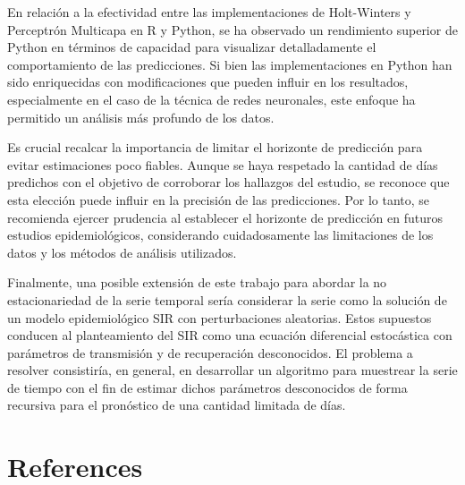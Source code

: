 \documentclass[
  us-letterpaper,
]{scrreprt}
\theoremstyle{definition}
\theoremstyle{plain}
\theoremstyle{plain}
\theoremstyle{definition}
\theoremstyle{remark}
\begin{document}
En relación a la efectividad entre las implementaciones de Holt-Winters
y Perceptrón Multicapa en R y Python, se ha observado un rendimiento
superior de Python en términos de capacidad para visualizar
detalladamente el comportamiento de las predicciones. Si bien las
implementaciones en Python han sido enriquecidas con modificaciones que
pueden influir en los resultados, especialmente en el caso de la técnica
de redes neuronales, este enfoque ha permitido un análisis más profundo
de los datos.

Es crucial recalcar la importancia de limitar el horizonte de predicción
para evitar estimaciones poco fiables. Aunque se haya respetado la
cantidad de días predichos con el objetivo de corroborar los hallazgos
del estudio, se reconoce que esta elección puede influir en la precisión
de las predicciones. Por lo tanto, se recomienda ejercer prudencia al
establecer el horizonte de predicción en futuros estudios
epidemiológicos, considerando cuidadosamente las limitaciones de los
datos y los métodos de análisis utilizados.

Finalmente, una posible extensión de este trabajo para abordar la no
estacionariedad de la serie temporal sería considerar la serie como la
solución de un modelo epidemiológico SIR con perturbaciones aleatorias.
Estos supuestos conducen al planteamiento del SIR como una ecuación
diferencial estocástica con parámetros de transmisión y de recuperación
desconocidos. El problema a resolver consistiría, en general, en
desarrollar un algoritmo para muestrear la serie de tiempo con el fin de
estimar dichos parámetros desconocidos de forma recursiva para el
pronóstico de una cantidad limitada de días.


\chapter*{References}\label{references}

\end{document}
